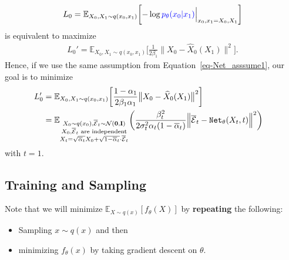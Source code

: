 \documentclass[
]{article}
\providecommand{\tightlist}{%
  \setlength{\itemsep}{0pt}\setlength{\parskip}{0pt}}\usepackage{longtable,booktabs,array}
\theoremstyle{remark}
\begin{document}
\begin{itemize}
\[\begin{aligned}
    L_0
    = \mathbb E_{X_0,X_1\sim q(x_0,x_1)} \biggl[ 
      -\log {\color{blue}{p_{\theta}(x_0 \vert x_1)}} \Big\vert_{x_0,x_1=X_0,X_1}
      \biggr]
  \end{aligned}
  \] is equivalent to maximize \[
  \begin{aligned}
    L_0'=\mathbb E_{X_0,X_1\sim q(x_0,x_1)} \biggl[
      \frac{1}{2\beta_1} \big\lVert X_0 - \widehat{X}_0(X_1) \big\rVert^2
      \biggr].
  \end{aligned}
  \] Hence, if we use the same assumption from
  Equation~\ref{eq-Net_asssume1}, our goal is to minimize \[
  \begin{aligned}
    L_0' &=  \mathbb E_{X_0,X_1\sim q(x_0,x_1)} \biggl[
      \frac{1-\alpha_1}{2\beta_1 \alpha_1} 
      \big\lVert X_0 - \widehat{X}_0(X_1)  
      \big\rVert^2
      \biggr]  \cr
      &=
      \mathbb E_{\substack{X_0\sim q(x_0), \overline{\mathcal{E}}_t\sim \mathcal{N}(\mathbf{0},\mathbf{I})\\ X_0,\overline{\mathcal{E}}_t \text{ are independent} \\ X_t=\sqrt{\overline{\alpha}_t}X_0+\sqrt{1-\overline{\alpha}_t}\cdot \overline{\mathcal{E}}_t}} \biggl( \frac{\beta_t^2}{2\sigma_t^2\alpha_t(1-\overline{\alpha}_t)} \Big\lVert \overline{\mathcal{E}}_t - \mathtt{Net}_{\theta}(X_t,t) \Big\rVert^2 \biggr)
  \end{aligned}
  \] with \(t=1.\)
\end{itemize}

\subsection{Training and Sampling}\label{training-and-sampling}

Note that we will minimize \(\mathbb E_{X\sim q(x)}[f_{\theta}(X)]\) by
\textbf{repeating} the following:

\begin{itemize}
\tightlist
\item
  Sampling \(x\sim q(x)\) and then
\item
  minimizing \(f_{\theta}(x)\) by taking gradient descent on \(\theta.\)
\end{itemize}
\end{document}
